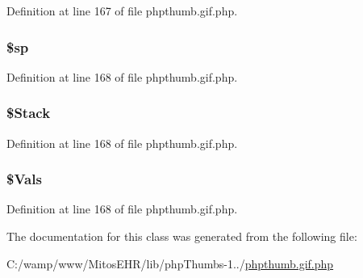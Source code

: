 \-Definition at line 167 of file phpthumb.\-gif.\-php.

\hypertarget{class_c_g_i_f_l_z_w_a0a4d69189b5c6ce87f2739cd82ead174}{
\subsubsection[{\$sp}]{\setlength{\rightskip}{0pt plus 5cm}\$sp}}\label{class_c_g_i_f_l_z_w_a0a4d69189b5c6ce87f2739cd82ead174}


\-Definition at line 168 of file phpthumb.\-gif.\-php.

\hypertarget{class_c_g_i_f_l_z_w_a0750a39f339d1c04fa8974737eebbd49}{
\subsubsection[{\$\-Stack}]{\setlength{\rightskip}{0pt plus 5cm}\$\-Stack}}\label{class_c_g_i_f_l_z_w_a0750a39f339d1c04fa8974737eebbd49}


\-Definition at line 168 of file phpthumb.\-gif.\-php.

\hypertarget{class_c_g_i_f_l_z_w_af5465bb9c32cba44ec0e1125fd64c5de}{
\subsubsection[{\$\-Vals}]{\setlength{\rightskip}{0pt plus 5cm}\$\-Vals}}\label{class_c_g_i_f_l_z_w_af5465bb9c32cba44ec0e1125fd64c5de}


\-Definition at line 168 of file phpthumb.\-gif.\-php.



\-The documentation for this class was generated from the following file\-:\begin{DoxyCompactItemize}
\item 
\-C\-:/wamp/www/\-Mitos\-E\-H\-R/lib/php\-Thumbs-\/1../\hyperlink{phpthumb_8gif_8php}{phpthumb.\-gif.\-php}\end{DoxyCompactItemize}
